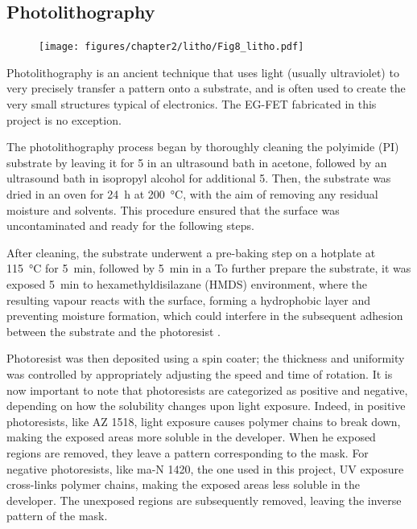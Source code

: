 \subsection{Photolithography}
\label{sec:lithography}

\begin{figure}[h]
    \centering
    \texttt{[image: figures/chapter2/litho/Fig8\_litho.pdf]}
    \caption{}
    \label{fig:litho}
\end{figure}

Photolithography is an ancient technique that uses light (usually ultraviolet) to very precisely transfer a pattern onto a substrate, and is often used to create the very small structures typical of electronics. The EG-FET fabricated in this project is no exception.

The photolithography process began by thoroughly cleaning the polyimide (PI) substrate by leaving it for \SI{5}{\min} in an ultrasound bath in acetone, followed by an ultrasound bath in isopropyl alcohol for additional \SI{5}{\min}.
Then, the substrate was dried in an oven for \SI{24}{\hour} at \SI{200}{\celsius}, with the aim of removing any residual moisture and solvents. This procedure ensured that the surface was uncontaminated and ready for the following steps.

After cleaning, the substrate underwent a pre-baking step on a hotplate at \SI{115}{\celsius} for \SI{5}{\minute}, followed by \SI{5}{\minute} in a 
To further prepare the substrate, it was exposed \SI{5}{\minute} to hexamethyldisilazane (HMDS) environment, where the resulting vapour reacts with the surface, forming a hydrophobic layer and preventing moisture formation, which could interfere in the subsequent adhesion between the substrate and the photoresist \citep{pollentierBake2022}.

Photoresist was then deposited using a spin coater; the thickness and uniformity was controlled by appropriately adjusting the speed and time of rotation.
It is now important to note that photoresists are categorized as positive and negative, depending on how the solubility changes upon light exposure. Indeed, in positive photoresists, like AZ 1518, light exposure causes polymer chains to break down, making the exposed areas more soluble in the developer. When he exposed regions are removed, they leave a pattern corresponding to the mask. For negative photoresists, like ma-N 1420, the one used in this project, UV exposure cross-links polymer chains, making the exposed areas less soluble in the developer. The unexposed regions are subsequently removed, leaving the inverse pattern of the mask.

